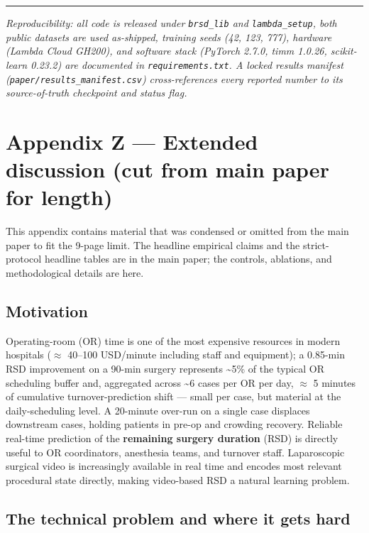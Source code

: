 \begin{center}\rule{0.5\linewidth}{0.5pt}\end{center}

\emph{Reproducibility: all code is released under \texttt{brsd\_lib} and
\texttt{lambda\_setup}, both public datasets are used as-shipped,
training seeds (42, 123, 777), hardware (Lambda Cloud GH200), and
software stack (PyTorch 2.7.0, timm 1.0.26, scikit-learn 0.23.2) are
documented in \texttt{requirements.txt}. A locked results manifest
(\texttt{paper/results\_manifest.csv}) cross-references every reported
number to its source-of-truth checkpoint and status flag.}

\section{Appendix Z --- Extended discussion (cut from main paper for length)}\label{appendix-z-extended-discussion-cut-from-main-paper-for-length}

This appendix contains material that was condensed or omitted from the
main paper to fit the 9-page limit. The headline empirical claims and
the strict- protocol headline tables are in the main paper; the
controls, ablations, and methodological details are here.

\subsection{Motivation}\label{motivation}

Operating-room (OR) time is one of the most expensive resources in
modern hospitals ($\approx$ 40--100 USD/minute including staff and equipment); a
0.85-min RSD improvement on a 90-min surgery represents
\textasciitilde5\% of the typical OR scheduling buffer and, aggregated
across \textasciitilde6 cases per OR per day, $\approx$ 5 minutes of cumulative
turnover-prediction shift --- small per case, but material at the
daily-scheduling level. A 20-minute over-run on a single case displaces
downstream cases, holding patients in pre-op and crowding recovery.
Reliable real-time prediction of the \textbf{remaining surgery duration}
(RSD) is directly useful to OR coordinators, anesthesia teams, and
turnover staff. Laparoscopic surgical video is increasingly available in
real time and encodes most relevant procedural state directly, making
video-based RSD a natural learning problem.

\subsection{The technical problem and where it gets
hard}\label{the-technical-problem-and-where-it-gets-hard}

